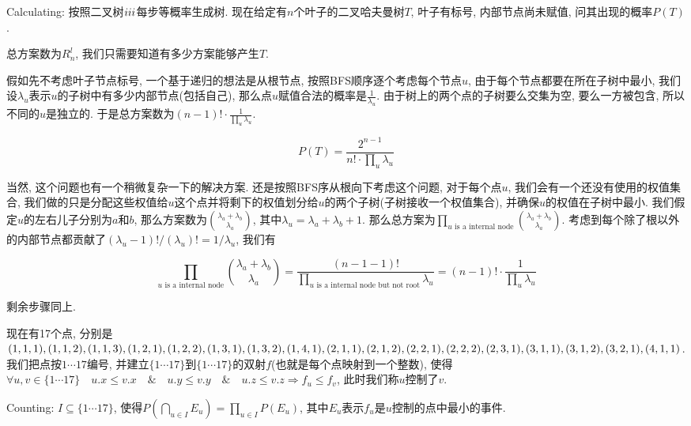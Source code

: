 	\begin{prob} [二叉树$\uppercase\expandafter{\romannumeral4}$]
		
		Calculating: 按照二叉树$\uppercase\expandafter{\romannumeral3}$每步等概率生成树. 现在给定有$n$个叶子的二叉哈夫曼树$T$, 叶子有标号, 内部节点尚未赋值, 问其出现的概率$P(T)$.
		
		\sol
		总方案数为$R_n^l$, 我们只需要知道有多少方案能够产生$T$.
		
		假如先不考虑叶子节点标号, 一个基于递归的想法是从根节点, 按照BFS顺序逐个考虑每个节点$u$, 由于每个节点都要在所在子树中最小, 我们设$\lambda_u$表示$u$的子树中有多少内部节点(包括自己), 那么点$u$赋值合法的概率是$\frac{1}{\lambda_u}$. 由于树上的两个点的子树要么交集为空, 要么一方被包含, 所以不同的$u$是独立的. 于是总方案数为$(n - 1)! \cdot \frac{1}{\prod\limits_{u}\lambda_u}$.
		
		\begin{equation*}
			P(T) = \dfrac{2^{n - 1}}{n! \cdot \prod\limits_{u} \lambda_u}
		\end{equation*}
		
		当然, 这个问题也有一个稍微复杂一下的解决方案. 还是按照BFS序从根向下考虑这个问题, 对于每个点$u$, 我们会有一个还没有使用的权值集合, 我们做的只是分配这些权值给$u$这个点并将剩下的权值划分给$u$的两个子树(子树接收一个权值集合), 并确保$u$的权值在子树中最小. 我们假定$u$的左右儿子分别为$a$和$b$, 那么方案数为$\binom{\lambda_a + \lambda_b}{\lambda_a}$, 其中$\lambda_u = \lambda_a + \lambda_b + 1$. 那么总方案为$\prod\limits_{u \text{ is a internal node}}\binom{\lambda_a + \lambda_b}{\lambda_a}$. 考虑到每个除了根以外的内部节点都贡献了$(\lambda_u-1)! / (\lambda_u)! = 1 / \lambda_u$, 我们有
		
		\begin{equation*}
			\prod\limits_{u \text{ is a internal node}}\binom{\lambda_a + \lambda_b}{\lambda_a} = \dfrac{(n - 1 - 1)!}{\prod\limits_{u \text{ is a internal node but not root}}\lambda_u} = (n - 1)! \cdot \frac{1}{\prod\limits_{u}\lambda_u}
		\end{equation*}
		
		剩余步骤同上.
		
	\end{prob}

	\begin{home} [概率链]
		
		现在有17个点, 分别是$(1, 1, 1), (1, 1, 2), (1, 1, 3), (1, 2, 1), (1, 2, 2), (1, 3, 1), (1, 3, 2),\\ (1, 4, 1), (2, 1, 1), (2, 1, 2), (2, 2, 1), (2, 2, 2), (2, 3, 1), (3, 1, 1), (3, 1, 2), (3, 2, 1), (4, 1, 1)$. 我们把点按$1\cdots 17$编号, 并建立$\{1\cdots 17\}$到$\{1\cdots 17\}$的双射$f$(也就是每个点映射到一个整数), 使得$\forall u, v \in \{1\cdots 17\} \quad u.x \le v.x \quad \& \quad u.y \le v.y \quad \& \quad u.z \le v.z \Rightarrow f_u \le f_v$, 此时我们称$u$控制了$v$.
		
		Counting: $I \subseteq \{1 \cdots 17\}$, 使得$P(\bigcap\limits_{u \in I}E_u) = \prod\limits_{u \in I}P(E_u)$, 其中$E_u$表示$f_u$是$u$控制的点中最小的事件.

	\end{home}
	
